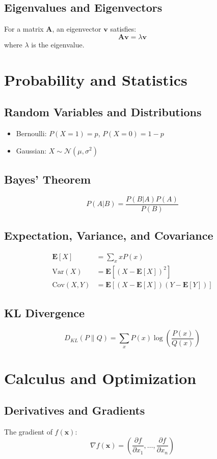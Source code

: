 \documentclass[openany]{book}
\begin{document}
\subsection{Eigenvalues and Eigenvectors}
For a matrix $\mathbf{A}$, an eigenvector $\mathbf{v}$ satisfies:
\[
\mathbf{Av} = \lambda\mathbf{v}
\]
where $\lambda$ is the eigenvalue.

\section{Probability and Statistics}

\subsection{Random Variables and Distributions}
\begin{itemize}
    \item Bernoulli: $P(X=1) = p$, $P(X=0) = 1-p$
    \item Gaussian: $X \sim \mathcal{N}(\mu, \sigma^2)$
\end{itemize}

\subsection{Bayes' Theorem}
\[
P(A|B) = \frac{P(B|A)P(A)}{P(B)}
\]

\subsection{Expectation, Variance, and Covariance}
\begin{align*}
\mathbf{E}[X] &= \sum_x xP(x) \\
\text{Var}(X) &= \mathbf{E}[(X-\mathbf{E}[X])^2] \\
\text{Cov}(X,Y) &= \mathbf{E}[(X-\mathbf{E}[X])(Y-\mathbf{E}[Y])]
\end{align*}

\subsection{KL Divergence}
\[
D_{KL}(P \| Q) = \sum_x P(x)\log\left(\frac{P(x)}{Q(x)}\right)
\]

\section{Calculus and Optimization}

\subsection{Derivatives and Gradients}
The gradient of $f(\mathbf{x})$:
\[
\nabla f(\mathbf{x}) = \left(\frac{\partial f}{\partial x_1}, \ldots, 
\frac{\partial f}{\partial x_n}\right)
\]
\end{document}
